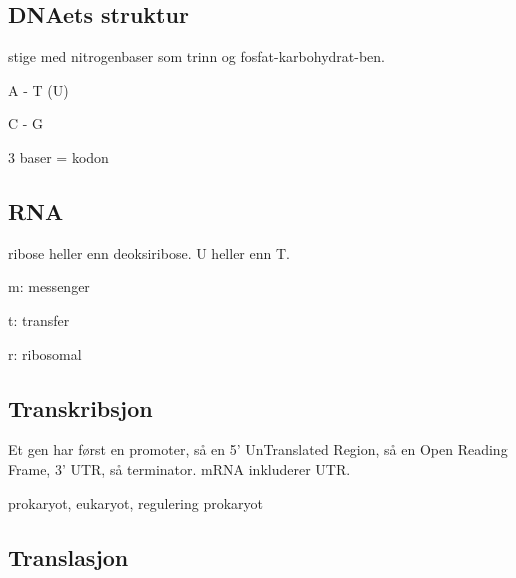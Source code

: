 \subsection{DNAets struktur}
    stige med nitrogenbaser som trinn og fosfat-karbohydrat-ben.

    A - T (U)

    C - G

    3 baser = kodon


\subsection{RNA}
    ribose heller enn deoksiribose. U heller enn T. 

    m: messenger

    t: transfer

    r: ribosomal

\subsection{Transkribsjon}
    Et gen har først en promoter, så en 5' UnTranslated Region, så en Open Reading Frame, 3' UTR, så terminator. 
    mRNA inkluderer UTR. 
    
    prokaryot, eukaryot, regulering prokaryot

\subsection{Translasjon}
